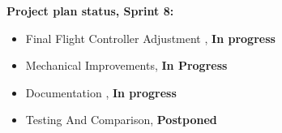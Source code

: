 \textbf{Project plan status, Sprint 8:}
\begin{itemize}
        \item Final Flight Controller Adjustment , \textbf{In progress}
        \item Mechanical Improvements, \textbf{In Progress}
        \item Documentation , \textbf{In progress}
        \item Testing And Comparison, \textbf{Postponed}
    \end{itemize}

%

